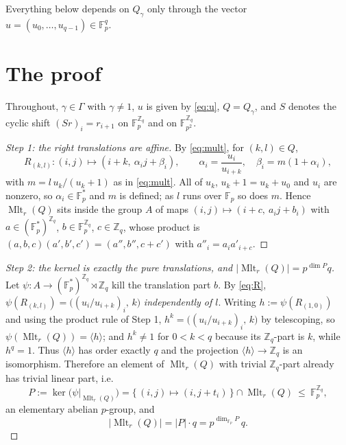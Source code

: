 \documentclass[11pt]{amsart}
\theoremstyle{definition}
\newcommand{\Mltr}{\operatorname{Mlt}_r}
\newcommand{\FF}[1]{\mathbb F_{#1}}
\newcommand{\Zq}{\mathbb Z_q}
\begin{document}
Everything below depends on $Q_\gamma$ only through the vector
$u=(u_0,\dots,u_{q-1})\in\FF p^{q}$.

\section{The proof}\label{sec:proof}

Throughout, $\gamma\in\Gamma$ with $\gamma\neq1$, $u$ is given by \eqref{eq:u},
$Q=Q_\gamma$, and $S$ denotes the cyclic shift $(Sr)_i=r_{i+1}$ on $\FF p^{\Zq}$
and on $\FF{p^{2}}^{\Zq}$.

\begin{proof}[Step 1: the right translations are affine]
By \eqref{eq:mult}, for $(k,l)\in Q$,
\begin{equation}\label{eq:R}
  R_{(k,l)}\colon(i,j)\longmapsto(i+k,\ \alpha_i j+\beta_i),
  \qquad
  \alpha_i=\frac{u_i}{u_{i+k}},\quad \beta_i=m(1+\alpha_i),
\end{equation}
with $m=l\,u_k/(u_k+1)$ as in \eqref{eq:mult}. All of $u_k$, $u_k+1=u_k+u_0$
and $u_i$ are nonzero, so $\alpha_i\in\FF p^{*}$ and $m$ is defined; as $l$ runs
over $\FF p$ so does $m$. Hence $\Mltr(Q)$ sits inside the group $A$ of maps
$(i,j)\mapsto(i+c,\ a_ij+b_i)$ with $a\in(\FF p^{*})^{\Zq}$,
$b\in\FF p^{\Zq}$, $c\in\Zq$, whose product is
$(a,b,c)(a',b',c')=(a''\!,b''\!,c+c')$ with $a''_i=a_ia'_{i+c}$.
\end{proof}

\begin{proof}[Step 2: the kernel is exactly the pure translations, and
$|\Mltr(Q)|=p^{\dim P}q$]
Let $\psi\colon A\to(\FF p^{*})^{\Zq}\rtimes\Zq$ kill the translation part
$b$. By \eqref{eq:R}, $\psi(R_{(k,l)})=\bigl((u_i/u_{i+k})_i,\,k\bigr)$
\emph{independently of $l$}. Writing $h:=\psi(R_{(1,0)})$ and using the product
rule of Step 1, $h^{k}=\bigl((u_i/u_{i+k})_i,\,k\bigr)$ by telescoping, so
$\psi(\Mltr(Q))=\langle h\rangle$; and $h^{k}\neq1$ for $0<k<q$ because its
$\Zq$-part is $k$, while $h^{q}=1$. Thus $\langle h\rangle$ has order exactly
$q$ and the projection $\langle h\rangle\to\Zq$ is an isomorphism. Therefore an
element of $\Mltr(Q)$ with trivial $\Zq$-part already has trivial linear part,
i.e.
\[
  P:=\ker\bigl(\psi|_{\Mltr(Q)}\bigr)
   =\{\,(i,j)\mapsto(i,j+t_i)\,\}\cap\Mltr(Q)
   \ \le\ \FF p^{\Zq},
\]
an elementary abelian $p$-group, and
\begin{equation}\label{eq:order}
  |\Mltr(Q)|=|P|\cdot q=p^{\dim_{\FF p}P}\,q .
\end{equation}
\end{proof}
\end{document}
